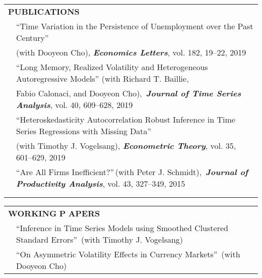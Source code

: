 \documentclass[10pt]{article}
\begin{document}
\begin{center}
\begin{tabular}{llllr}
\multicolumn{5}{l}{{\Large \textbf{P}}\textbf{UBLICATIONS}} \vspace{0.1cm}\\
& \multicolumn{4}{l}{\textquotedblleft Time Variation in the Persistence of Unemployment over the Past Century\textquotedblright}\\
 & \multicolumn{4}{l}{\hspace{0.2cm}(with Dooyeon Cho), {\bf\emph{Economics Letters}}, vol. 182, 19--22, 2019}  \vspace{0.1cm}\\
& \multicolumn{4}{l}{\textquotedblleft  Long Memory, Realized Volatility and Heterogeneous Autoregressive Models\textquotedblright \,\,(with Richard T. Baillie, \ }\\
& \multicolumn{4}{l}{\hspace{0.2cm}Fabio Calonaci, and Dooyeon Cho),\, \emph{{\bf\emph{Journal of Time Series Analysis}}}, vol. 40, 609--628, 2019} \vspace{0.1cm}\\
 & \multicolumn{4}{l}{\textquotedblleft Heteroskedasticity Autocorrelation Robust Inference in Time Series Regressions with Missing Data\textquotedblright \ } \\
& \multicolumn{4}{l}{\hspace{0.2cm}(with Timothy J. Vogelsang), \emph{{\bf\emph {Econometric Theory}}}, vol. 35, 601--629, 2019}  \vspace{0.1cm}\\
& \multicolumn{4}{l}{\textquotedblleft Are All Firms Inefficient?\textquotedblright \,(with Peter J. Schmidt),\, {\bf\emph{Journal of Productivity Analysis}}, vol. 43, 327--349, 2015 } \\
\multicolumn{5}{p{500pt}}{}\\\\
\end{tabular}
\begin{tabular}{llllr}
\multicolumn{5}{l}{{\Large \textbf{W}}\textbf{ORKING} {\Large \textbf{P}}%
\textbf{APERS}} \vspace{0.1cm}\\
& \multicolumn{4}{l}{\textquotedblleft Inference in Time Series Models using Smoothed Clustered Standard Errors\textquotedblright \ (with Timothy J. Vogelsang)} \vspace{0.1cm}\\
& \multicolumn{4}{l}{\textquotedblleft On Asymmetric Volatility Effects in Currency Markets\textquotedblright \ (with Dooyeon Cho)} \vspace{0.1cm}\\

\end{tabular}
\end{center}
\end{document}
